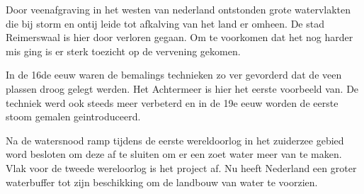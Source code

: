 Door veenafgraving in het westen van nederland ontstonden grote watervlakten die bij storm en ontij leide tot afkalving van het land er omheen.
De stad Reimerswaal is hier door verloren gegaan.
Om te voorkomen dat het nog harder mis ging is er sterk toezicht op de vervening gekomen.

In de 16de eeuw waren de bemalings technieken zo ver gevorderd dat de veen plassen droog gelegt werden.
Het Achtermeer is hier het eerste voorbeeld van.
De techniek werd ook steeds meer verbeterd en in de 19e eeuw worden de eerste stoom gemalen geintroduceerd.

Na de watersnood ramp tijdens de eerste wereldoorlog in het zuiderzee gebied word besloten om deze af te sluiten om er een zoet water meer van te maken.
Vlak voor de tweede wereloorlog is het project af.
Nu heeft Nederland een groter waterbuffer tot zijn beschikking om de landbouw van water te voorzien.



